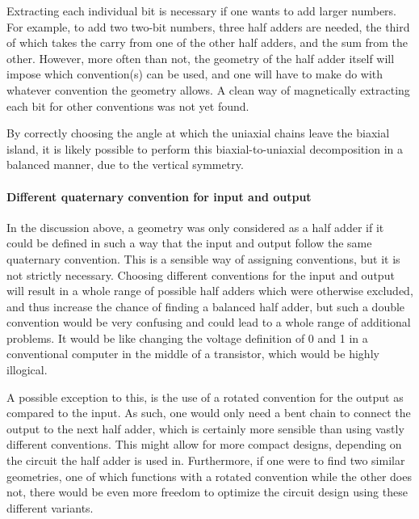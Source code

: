 \documentclass[11pt,a4paper,english,twoside]{article}
\begin{document}
Extracting each individual bit is necessary if one wants to add larger numbers. For example, to add two two-bit numbers, three half adders are needed, the third of which takes the carry from one of the other half adders, and the sum from the other. However, more often than not, the geometry of the half adder itself will impose which convention(s) can be used, and one will have to make do with whatever convention the geometry allows. A clean way of magnetically extracting each bit for other conventions was not yet found. \par
By correctly choosing the angle at which the uniaxial chains leave the biaxial island, it is likely possible to perform this biaxial-to-uniaxial decomposition in a balanced manner, due to the vertical symmetry.

\paragraph{Different quaternary convention for input and output}
In the discussion above, a geometry was only considered as a half adder if it could be defined in such a way that the input and output follow the same quaternary convention. This is a sensible way of assigning conventions, but it is not strictly necessary. Choosing different conventions for the input and output will result in a whole range of possible half adders which were otherwise excluded, and thus increase the chance of finding a balanced half adder, but such a double convention would be very confusing and could lead to a whole range of additional problems. It would be like changing the voltage definition of 0 and 1 in a conventional computer in the middle of a transistor, which would be highly illogical. \par
A possible exception to this, is the use of a rotated convention for the output as compared to the input. As such, one would only need a bent chain to connect the output to the next half adder, which is certainly more sensible than using vastly different conventions. This might allow for more compact designs, depending on the circuit the half adder is used in. Furthermore, if one were to find two similar geometries, one of which functions with a rotated convention while the other does not, there would be even more freedom to optimize the circuit design using these different variants.

\cleardoublepage
\end{document}
